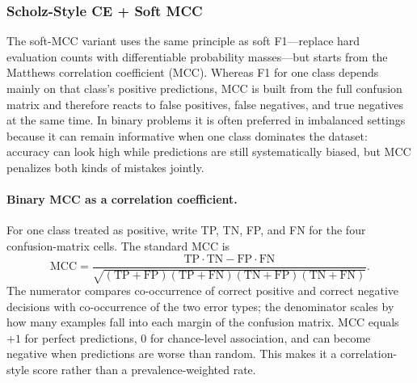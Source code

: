 \documentclass[11pt]{article}
\begin{document}
\subsubsection{Scholz-Style CE + Soft MCC}
The soft-MCC variant uses the same principle as soft F1---replace hard evaluation counts with differentiable probability masses---but starts from the Matthews correlation coefficient (MCC). Whereas F1 for one class depends mainly on that class's positive predictions, MCC is built from the full confusion matrix and therefore reacts to false positives, false negatives, and true negatives at the same time. In binary problems it is often preferred in imbalanced settings because it can remain informative when one class dominates the dataset: accuracy can look high while predictions are still systematically biased, but MCC penalizes both kinds of mistakes jointly.

\paragraph{Binary MCC as a correlation coefficient.}
For one class treated as positive, write TP, TN, FP, and FN for the four confusion-matrix cells. The standard MCC is
\begin{equation}
  \mathrm{MCC} =
  \frac{\mathrm{TP}\cdot\mathrm{TN}-\mathrm{FP}\cdot\mathrm{FN}}
       {\sqrt{(\mathrm{TP}+\mathrm{FP})(\mathrm{TP}+\mathrm{FN})
              (\mathrm{TN}+\mathrm{FP})(\mathrm{TN}+\mathrm{FN})}}.
  \label{eq:binary-mcc}
\end{equation}
\noindent The numerator compares co-occurrence of correct positive and correct negative decisions with co-occurrence of the two error types; the denominator scales by how many examples fall into each margin of the confusion matrix. MCC equals $+1$ for perfect predictions, $0$ for chance-level association, and can become negative when predictions are worse than random. This makes it a correlation-style score rather than a prevalence-weighted rate.
\end{document}
